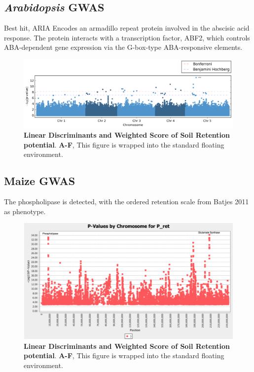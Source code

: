 \documentclass[10pt,letterpaper]{article}
\begin{document}
\subsection*{\textit{Arabidopsis} GWAS}
Best hit, ARIA Encodes an armadillo repeat protein involved in the abscisic acid response. The protein interacts with a transcription factor, ABF2, which controls ABA-dependent gene expression via the G-box-type ABA-responsive elements. 

\begin{figure}[ht] %

\includegraphics[width=\textwidth]{fig3.png}

\caption{\color{Gray} \textbf{Linear Discriminants and Weighted Score of Soil Retention potential}. \textbf{A-F}, This figure is wrapped into the standard floating environment.}

\label{fig3} %

\end{figure}


\subsection*{Maize GWAS}
The phospholipase is detected, with the ordered retention scale from Batjes 2011 as phenotype.

\begin{figure}[ht] %

\includegraphics[width=\textwidth]{fig4.png}

\caption{\color{Gray} \textbf{Linear Discriminants and Weighted Score of Soil Retention potential}. \textbf{A-F}, This figure is wrapped into the standard floating environment.}

\label{fig4} %

\end{figure}
\end{document}
